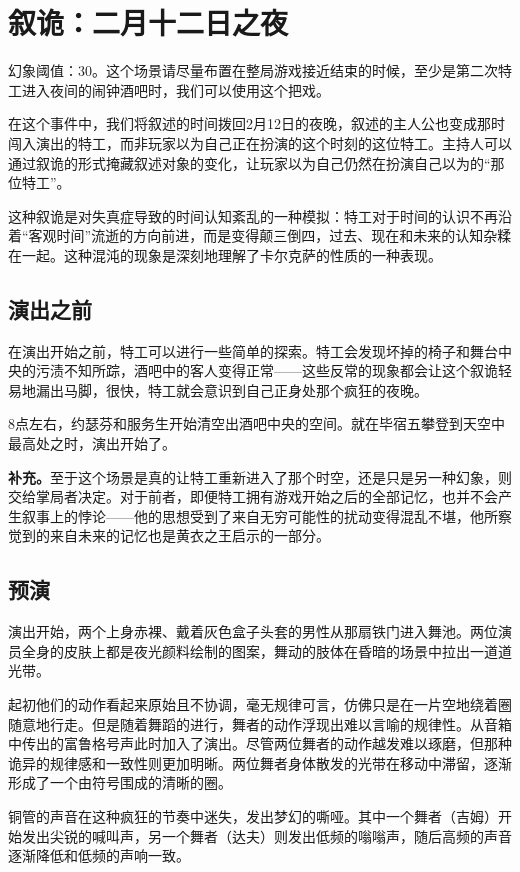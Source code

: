 \section{叙诡：二月十二日之夜}

幻象阈值：30。这个场景请尽量布置在整局游戏接近结束的时候，至少是第二次特工进入夜间的闹钟酒吧时，我们可以使用这个把戏。

在这个事件中，我们将叙述的时间拨回2月12日的夜晚，叙述的主人公也变成那时闯入演出的特工，而非玩家以为自己正在扮演的这个时刻的这位特工。主持人可以通过叙诡的形式掩藏叙述对象的变化，让玩家以为自己仍然在扮演自己以为的“那位特工”。

这种叙诡是对失真症导致的时间认知紊乱的一种模拟：特工对于时间的认识不再沿着“客观时间”流逝的方向前进，而是变得颠三倒四，过去、现在和未来的认知杂糅在一起。这种混沌的现象是深刻地理解了卡尔克萨的性质的一种表现。

\subsection{演出之前}

在演出开始之前，特工可以进行一些简单的探索。特工会发现坏掉的椅子和舞台中央的污渍不知所踪，酒吧中的客人变得正常——这些反常的现象都会让这个叙诡轻易地漏出马脚，很快，特工就会意识到自己正身处那个疯狂的夜晚。

8点左右，约瑟芬和服务生开始清空出酒吧中央的空间。就在毕宿五攀登到天空中最高处之时，演出开始了。

\textbf{补充。}至于这个场景是真的让特工重新进入了那个时空，还是只是另一种幻象，则交给掌局者决定。对于前者，即便特工拥有游戏开始之后的全部记忆，也并不会产生叙事上的悖论——他的思想受到了来自无穷可能性的扰动变得混乱不堪，他所察觉到的来自未来的记忆也是黄衣之王启示的一部分。

\subsection{预演}
演出开始，两个上身赤裸、戴着灰色盒子头套的男性从那扇铁门进入舞池。两位演员全身的皮肤上都是夜光颜料绘制的图案，舞动的肢体在昏暗的场景中拉出一道道光带。

起初他们的动作看起来原始且不协调，毫无规律可言，仿佛只是在一片空地绕着圈随意地行走。但是随着舞蹈的进行，舞者的动作浮现出难以言喻的规律性。从音箱中传出的富鲁格号声此时加入了演出。尽管两位舞者的动作越发难以琢磨，但那种诡异的规律感和一致性则更加明晰。两位舞者身体散发的光带在移动中滞留，逐渐形成了一个由符号围成的清晰的圈。

铜管的声音在这种疯狂的节奏中迷失，发出梦幻的嘶哑。其中一个舞者（吉姆）开始发出尖锐的喊叫声，另一个舞者（达夫）则发出低频的嗡嗡声，随后高频的声音逐渐降低和低频的声响一致。

